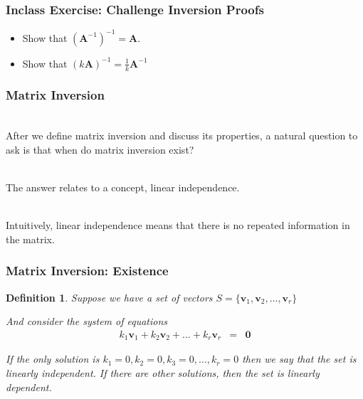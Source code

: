 \documentclass{beamer}
\newtheorem{defn}{Definition}
\numberwithin{equation}{section}
\begin{document}
\begin{frame}
\frametitle{Inclass Exercise: Challenge Inversion Proofs}

\begin{itemize}
\item[-] Show that $(\boldsymbol{A}^{-1})^{-1}  = \boldsymbol{A}$.  
\item[-] Show that $(k \boldsymbol{A})^{-1} = \frac{1}{k} \boldsymbol{A}^{-1}$
\end{itemize}

\end{frame}



\begin{frame}
\frametitle{Matrix Inversion}

\ \\After we define matrix inversion and discuss its properties, a natural question to ask is that when do matrix inversion exist? \pause

\ \\The answer relates to a concept, linear independence. \pause

\ \\Intuitively, linear independence means that there is no repeated information in the matrix.

\end{frame}



\begin{frame}
\frametitle{Matrix Inversion: Existence}


\begin{defn} Suppose we have a set of vectors $S =\{ \boldsymbol{v}_{1}, \boldsymbol{v}_{2}, \hdots, \boldsymbol{v}_{r}\}$ 

And consider the system of equations 
\begin{eqnarray}
k_{1} \boldsymbol{v}_{1} + k_{2} \boldsymbol{v}_{2} + \hdots + k_{r} \boldsymbol{v}_{r} & = & \boldsymbol{0} \nonumber 
\end{eqnarray}

If the only solution is $k_{1} = 0, k_{2} = 0, k_{3} = 0, \hdots, k_{r} = 0$ then we say that the set is linearly independent.  If there are other solutions, then the set is linearly dependent.

\end{defn}

\end{frame}
\end{document}
